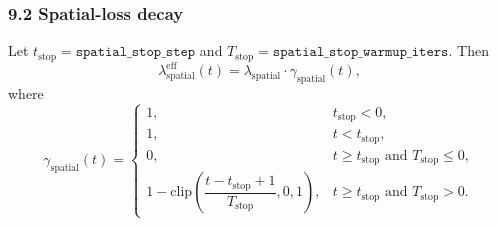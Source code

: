 \documentclass[11pt]{article}
\begin{document}
\subsubsection*{9.2 Spatial-loss decay}
Let $t_{\mathrm{stop}}=\texttt{spatial\_stop\_step}$ and $T_{\mathrm{stop}}=\texttt{spatial\_stop\_warmup\_iters}$. Then
\[
  \lambda_{\mathrm{spatial}}^{\mathrm{eff}}(t)
  =
  \lambda_{\mathrm{spatial}} \cdot \gamma_{\mathrm{spatial}}(t),
\]
where
\[
  \gamma_{\mathrm{spatial}}(t)
  =
  \begin{cases}
    1, & t_{\mathrm{stop}} < 0,\\[4pt]
    1, & t < t_{\mathrm{stop}},\\[4pt]
    0, & t\ge t_{\mathrm{stop}} \text{ and } T_{\mathrm{stop}}\le 0,\\[4pt]
    1-\mathrm{clip}\!\left(\dfrac{t-t_{\mathrm{stop}}+1}{T_{\mathrm{stop}}}, 0, 1\right),
    & t\ge t_{\mathrm{stop}} \text{ and } T_{\mathrm{stop}}>0.
  \end{cases}
\]
\end{document}
